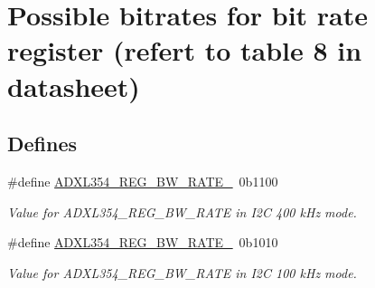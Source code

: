 \hypertarget{group___a_d_x_l354___r_e_g___b_w___r_a_t_e___m_o_d_e_s}{\section{\-Possible bitrates for bit rate register (refert to table 8 in datasheet)}
\label{group___a_d_x_l354___r_e_g___b_w___r_a_t_e___m_o_d_e_s}
}
\subsection*{\-Defines}
\begin{DoxyCompactItemize}
\item 
\hypertarget{group___a_d_x_l354___r_e_g___b_w___r_a_t_e___m_o_d_e_s_ga6abc5023bd9df39ff2cd303befc3b8a4}{\#define \hyperlink{group___a_d_x_l354___r_e_g___b_w___r_a_t_e___m_o_d_e_s_ga6abc5023bd9df39ff2cd303befc3b8a4}{\-A\-D\-X\-L354\-\_\-\-R\-E\-G\-\_\-\-B\-W\-\_\-\-R\-A\-T\-E\-\_}~0b1100}\label{group___a_d_x_l354___r_e_g___b_w___r_a_t_e___m_o_d_e_s_ga6abc5023bd9df39ff2cd303befc3b8a4}

\begin{DoxyCompactList}\small\item\em \-Value for \-A\-D\-X\-L354\-\_\-\-R\-E\-G\-\_\-\-B\-W\-\_\-\-R\-A\-T\-E in \-I2\-C 400 k\-Hz mode. \end{DoxyCompactList}\item 
\hypertarget{group___a_d_x_l354___r_e_g___b_w___r_a_t_e___m_o_d_e_s_ga784c050f85ee0151686c9bbfde354fad}{\#define \hyperlink{group___a_d_x_l354___r_e_g___b_w___r_a_t_e___m_o_d_e_s_ga784c050f85ee0151686c9bbfde354fad}{\-A\-D\-X\-L354\-\_\-\-R\-E\-G\-\_\-\-B\-W\-\_\-\-R\-A\-T\-E\-\_}~0b1010}\label{group___a_d_x_l354___r_e_g___b_w___r_a_t_e___m_o_d_e_s_ga784c050f85ee0151686c9bbfde354fad}

\begin{DoxyCompactList}\small\item\em \-Value for \-A\-D\-X\-L354\-\_\-\-R\-E\-G\-\_\-\-B\-W\-\_\-\-R\-A\-T\-E in \-I2\-C 100 k\-Hz mode. \end{DoxyCompactList}\end{DoxyCompactItemize}
